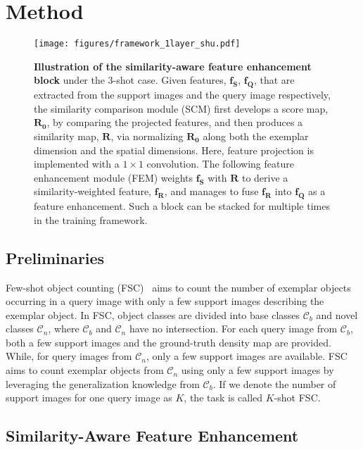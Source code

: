 \documentclass[10pt,twocolumn,letterpaper]{article}
\newcommand{\fs}{\bm{f_S}}
\newcommand{\fq}{\bm{f_Q}}
\newcommand{\Rraw}{\bm{R_0}}
\newcommand{\Rnorm}{\bm{R}}
\newcommand{\fweight}{\bm{f_R}}
\begin{document}
 \section{Method}\label{sec:method}


\begin{figure*}[t]
    \centering
    \texttt{[image: figures/framework\_1layer\_shu.pdf]}
    \vspace{-3pt}
    \caption{
        \textbf{Illustration of the similarity-aware feature enhancement block} under the 3-shot case.
Given features, $\fs$, $\fq$, that are extracted from the support images and the query image respectively, the similarity comparison module (SCM) first develops a score map, $\Rraw$, by comparing the projected features, and then produces a similarity map, $\Rnorm$, via normalizing $\Rraw$ along both the exemplar dimension and the spatial dimensions.
Here, feature projection is implemented with a $1\times1$ convolution.
The following feature enhancement module (FEM) weights $\fs$ with $\Rnorm$ to derive a similarity-weighted feature, $\fweight$, and manages to fuse $\fweight$ into $\fq$ as a feature enhancement. 
Such a block can be stacked for multiple times in the training framework. 
    }
    \label{fig:framework}
    \vspace{-15pt}
\end{figure*}


\subsection{Preliminaries}\label{subsec:preliminaries}


Few-shot object counting (FSC)~\cite{famnet} aims to count the number of exemplar objects occurring in a query image with only a few support images describing the exemplar object. 
In FSC, object classes are divided into base classes $\mathcal{C}_b$ and novel classes $\mathcal{C}_n$, where $\mathcal{C}_b$ and $\mathcal{C}_n$ have no intersection. 
For each query image from $\mathcal{C}_b$, both a few support images and the ground-truth density map are provided. 
While, for query images from $\mathcal{C}_n$, only a few support images are available. 
FSC aims to count exemplar objects from $\mathcal{C}_n$ using only a few support images by leveraging the generalization knowledge from $\mathcal{C}_b$. 
If we denote the number of support images for one query image as $K$, the task is called $K$-shot FSC. 


\subsection{Similarity-Aware Feature Enhancement}\label{subsec:core-block}
\end{document}

